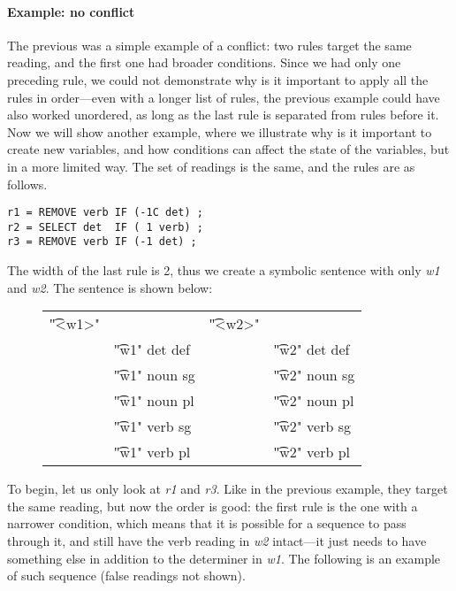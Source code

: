 \paragraph{Example: no conflict}
The previous was a simple example of a conflict: two rules target the same reading, and the first one had broader conditions. 
Since we had only one preceding rule, we could not demonstrate why is it important to apply all the rules in order---even with a longer list of rules, the previous example could have also worked unordered, as long as the last rule is separated from rules before it.
Now we will show another example, where we illustrate why is it important to create new variables, and how conditions can affect the state of the variables, but in a more limited way. The set of readings is the same, and the rules are as follows.

\begin{verbatim}
r1 = REMOVE verb IF (-1C det) ;
r2 = SELECT det  IF ( 1 verb) ;
r3 = REMOVE verb IF (-1 det) ;
\end{verbatim}

\noindent The width of the last rule is 2, thus we create a symbolic sentence with only {\em w1} and {\em w2}. The sentence is shown below:

\begin{figure}[h]
\centering 
\begin{tabular}{p{0.6cm} l  p{0.6cm} l }
\t{"<w1>"}    &                     &  \t{"<w2>"}  &           \\
              & \t{"w1" det def}    & &      \t{"w2" det def}  \\
              & \t{"w1" noun sg}    & &      \t{"w2" noun sg}  \\
              & \t{"w1" noun pl}    & &      \t{"w2" noun pl}  \\
              & \t{"w1" verb sg}    & &      \t{"w2" verb sg}  \\
              & \t{"w1" verb pl}    & &      \t{"w2" verb pl}  \\
\end{tabular}
\end{figure}


To begin, let us only look at {\em r1} and {\em r3}. Like in the previous example, they target the same reading, but now the order is good: the first rule is the one with a narrower condition, which means that it is possible for a sequence to pass through it, and still have the verb reading in {\em w2} intact---it just needs to have something else in addition to the determiner in {\em w1}.
The following is an example of such sequence (false readings not shown). %

